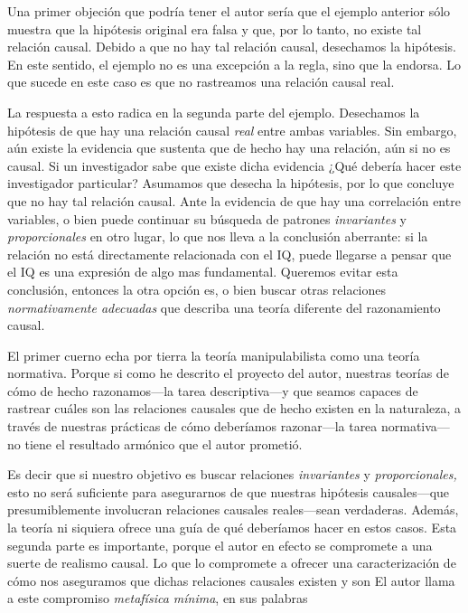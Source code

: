 Una primer objeción que podría tener el autor sería que el
ejemplo anterior sólo muestra que la hipótesis original era
falsa y que, por lo tanto, no existe tal relación causal.
Debido a que no hay tal relación causal, desechamos la
hipótesis. En este sentido,  el ejemplo no es una excepción
a la regla, sino que la endorsa. Lo que sucede en este caso
es que no rastreamos una relación causal real.

La respuesta a esto radica en la segunda parte del ejemplo.
Desechamos la hipótesis de que hay una relación causal
\emph{real} entre ambas variables. Sin embargo, aún existe
la evidencia que sustenta que de hecho hay una relación, aún
si no es causal. Si un investigador sabe que existe dicha
evidencia ¿Qué debería hacer este investigador particular?
Asumamos que desecha la hipótesis, por lo que concluye que
no hay tal relación causal. Ante la evidencia de que hay una
correlación entre variables, o bien puede continuar su
búsqueda de patrones \emph{invariantes} y
\emph{proporcionales} en otro lugar, lo que nos lleva a la
conclusión aberrante: si la relación no está directamente
relacionada con el IQ, puede llegarse a pensar que el IQ es
una expresión de algo mas fundamental. Queremos evitar esta
conclusión, entonces la otra opción es, o bien buscar otras
relaciones \emph{normativamente adecuadas} que describa una
teoría diferente del razonamiento causal.

El primer cuerno echa por tierra la teoría manipulabilista
como una teoría normativa. Porque si como he descrito el
proyecto del autor, nuestras teorías de cómo de hecho
razonamos---la tarea descriptiva---y que seamos capaces de
rastrear cuáles son las relaciones causales que de hecho
existen en la naturaleza, a través de nuestras prácticas de
cómo deberíamos razonar---la tarea normativa---no tiene el
resultado armónico que el autor prometió.   

Es decir que si nuestro objetivo es buscar relaciones
\emph{invariantes} y \emph{proporcionales,} esto no será
suficiente para asegurarnos de que nuestras hipótesis
causales---que presumiblemente involucran relaciones
causales reales---sean verdaderas. Además, la teoría ni
siquiera ofrece una guía de qué deberíamos hacer en estos
casos. Esta segunda parte es importante, porque el autor en
efecto se compromete a una suerte de realismo causal. Lo
que lo compromete a ofrecer una caracterización de cómo nos
aseguramos que dichas relaciones causales existen y son
 El autor llama a este compromiso
\emph{metafísica mínima}, en sus palabras


